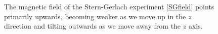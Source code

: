 \documentclass[onecolumn,secnumarabic,amsmath,amssymb,balancelastpage,nofootinbib]{article}
\begin{document}
\begin{figure}[p!]
\caption{The magnetic field of the Stern-Gerlach experiment \eqref{SGfield} points primarily upwards, becoming weaker as we move up in the $z$ direction and tilting outwards as we move away from the $z$ axis.}
  \label{SGfieldfig}
\end{figure}
\end{document}
